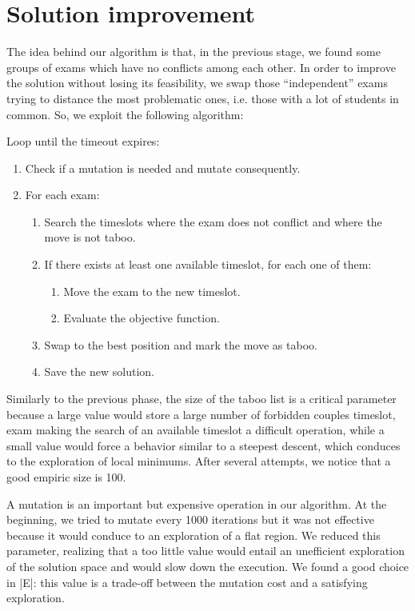 \section*{Solution improvement}
The idea behind our algorithm is that, in the previous stage, we found some groups of exams which have no conflicts among each other. In order to improve the solution without losing its feasibility, we swap those ``independent'' exams trying to distance the most problematic ones, i.e. those with a lot of students in common.
So, we exploit the following algorithm:

Loop until the timeout expires:
\begin{enumerate}
\item Check if a mutation is needed and mutate consequently.
\item For each exam:
\begin{enumerate}
\item Search the timeslots where the exam does not conflict and where the move is not taboo.
\item If there exists at least one available timeslot, for each one of them:
\begin{enumerate}
\item Move the exam to the new timeslot.
\item Evaluate the objective function.
\end{enumerate}
\item Swap to the best position and mark the move as taboo.
\item Save the new solution.
\end{enumerate}
\end{enumerate}
Similarly to the previous phase, the size of the taboo list is a critical parameter because a large value would store a large number of forbidden couples timeslot, exam making the search of an available timeslot a difficult operation, while a small value would force a behavior similar to a steepest descent, which conduces to the exploration of local minimums. After several attempts, we notice that a good empiric size is 100.

A mutation is an important but expensive operation in our algorithm. At the beginning, we tried to mutate every 1000 iterations but it was not effective because it would conduce to an exploration of a flat region. We reduced this parameter, realizing that a too little value would entail an unefficient exploration of the solution space and would slow down the execution. We found a good choice in |E|: this value is a trade-off between the mutation cost and a satisfying exploration.
